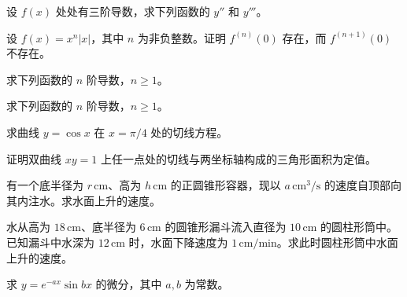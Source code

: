 \noindent\begin{minipage}{\textwidth}
设 $f(x)$ 处处有三阶导数，求下列函数的 $y''$ 和 $y'''$。
\end{minipage}\par\vfill
\noindent\begin{minipage}{\textwidth}
设 $f(x)=x^n|x|$，其中 $n$ 为非负整数。证明 $f^{(n)}(0)$ 存在，而 $f^{(n+1)}(0)$ 不存在。
\end{minipage}\par\vfill
\noindent\begin{minipage}{\textwidth}
求下列函数的 $n$ 阶导数，$n\ge1$。
\end{minipage}\par\vfill
\newpage
\noindent\begin{minipage}{\textwidth}
求下列函数的 $n$ 阶导数，$n\ge1$。
\end{minipage}\par\vfill
\noindent\begin{minipage}{\textwidth}
求曲线 $y=\cos x$ 在 $x=\pi/4$ 处的切线方程。
\end{minipage}\par\vfill
\noindent\begin{minipage}{\textwidth}
证明双曲线 $xy=1$ 上任一点处的切线与两坐标轴构成的三角形面积为定值。
\end{minipage}\par\vfill
\noindent\begin{minipage}{\textwidth}
有一个底半径为 $r\,\mathrm{cm}$、高为 $h\,\mathrm{cm}$ 的正圆锥形容器，现以 $a\,\mathrm{cm}^3/\mathrm{s}$ 的速度自顶部向其内注水。求水面上升的速度。
\end{minipage}\par\vfill
\newpage
\noindent\begin{minipage}{\textwidth}
水从高为 $18\,\mathrm{cm}$、底半径为 $6\,\mathrm{cm}$ 的圆锥形漏斗流入直径为 $10\,\mathrm{cm}$ 的圆柱形筒中。已知漏斗中水深为 $12\,\mathrm{cm}$ 时，水面下降速度为 $1\,\mathrm{cm}/\mathrm{min}$。求此时圆柱形筒中水面上升的速度。
\end{minipage}\par\vfill
\noindent\begin{minipage}{\textwidth}
求 $y=e^{-ax}\sin bx$ 的微分，其中 $a,b$ 为常数。
\end{minipage}\par\vfill
